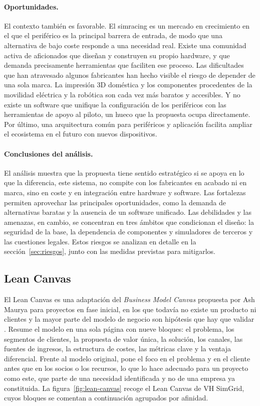 \paragraph{Oportunidades.}
El contexto también es favorable. El simracing es un mercado en crecimiento en el que el periférico es la principal barrera de entrada, de modo que una alternativa de bajo coste responde a una necesidad real. Existe una comunidad activa de aficionados que diseñan y construyen su propio hardware, y que demanda precisamente herramientas que faciliten ese proceso. Las dificultades que han atravesado algunos fabricantes han hecho visible el riesgo de depender de una sola marca. La impresión 3D doméstica y los componentes procedentes de la movilidad eléctrica y la robótica son cada vez más baratos y accesibles. Y no existe un software que unifique la configuración de los periféricos con las herramientas de apoyo al piloto, un hueco que la propuesta ocupa directamente. Por último, una arquitectura común para periféricos y aplicación facilita ampliar el ecosistema en el futuro con nuevos dispositivos.

\paragraph{Conclusiones del análisis.}
El análisis muestra que la propuesta tiene sentido estratégico si se apoya en lo que la diferencia, este sistema, no compite con los fabricantes en acabado ni en marca, sino en coste y en integración entre hardware y software. Las fortalezas permiten aprovechar las principales oportunidades, como la demanda de alternativas baratas y la ausencia de un software unificado. Las debilidades y las amenazas, en cambio, se concentran en tres ámbitos que condicionan el diseño: la seguridad de la base, la dependencia de componentes y simuladores de terceros y las cuestiones legales. Estos riesgos se analizan en detalle en la sección~\ref{sec:riesgos}, junto con las medidas previstas para mitigarlos.

\subsection{Lean Canvas}
\label{sec:lean-canvas}

El Lean Canvas es una adaptación del \textit{Business Model Canvas} propuesta por Ash Maurya para proyectos en fase inicial, en los que todavía no existe un producto ni clientes y la mayor parte del modelo de negocio son hipótesis que hay que validar \parencite{maurya_2012_running_lean}. Resume el modelo en una sola página con nueve bloques: el problema, los segmentos de clientes, la propuesta de valor única, la solución, los canales, las fuentes de ingresos, la estructura de costes, las métricas clave y la ventaja diferencial. Frente al modelo original, pone el foco en el problema y en el cliente antes que en los socios o los recursos, lo que lo hace adecuado para un proyecto como este, que parte de una necesidad identificada y no de una empresa ya constituida. La figura~\ref{fig:lean-canvas} recoge el Lean Canvas de VH SimGrid, cuyos bloques se comentan a continuación agrupados por afinidad.

